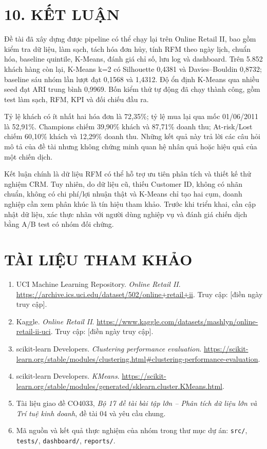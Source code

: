 \documentclass[a4paper]{article}
\begin{document}
\section*{10. KẾT LUẬN}

Đề tài đã xây dựng được pipeline có thể chạy lại trên Online Retail II, bao gồm kiểm tra dữ liệu, làm sạch, tách hóa đơn hủy, tính RFM theo ngày lịch, chuẩn hóa, baseline quintile, K-Means, đánh giá chỉ số, lưu log và dashboard. Trên 5.852 khách hàng còn lại, K-Means k=2 có Silhouette 0,4381 và Davies--Bouldin 0,8732; baseline sáu nhóm lần lượt đạt 0,1568 và 1,4312. Độ ổn định K-Means qua nhiều seed đạt ARI trung bình 0,9969. Bốn kiểm thử tự động đã chạy thành công, gồm test làm sạch, RFM, KPI và đối chiếu đầu ra.

Tỷ lệ khách có ít nhất hai hóa đơn là 72,35\%; tỷ lệ mua lại qua mốc 01/06/2011 là 52,91\%. Champions chiếm 39,90\% khách và 87,71\% doanh thu; At-risk/Lost chiếm 60,10\% khách và 12,29\% doanh thu. Những kết quả này trả lời các câu hỏi mô tả của đề tài nhưng không chứng minh quan hệ nhân quả hoặc hiệu quả của một chiến dịch.

Kết luận chính là dữ liệu RFM có thể hỗ trợ ưu tiên phân tích và thiết kế thử nghiệm CRM. Tuy nhiên, do dữ liệu cũ, thiếu Customer ID, không có nhãn chuẩn, không có chi phí/lợi nhuận thật và K-Means chỉ tạo hai cụm, doanh nghiệp cần xem phân khúc là tín hiệu tham khảo. Trước khi triển khai, cần cập nhật dữ liệu, xác thực nhãn với người dùng nghiệp vụ và đánh giá chiến dịch bằng A/B test có nhóm đối chứng.


\section*{TÀI LIỆU THAM KHẢO}

\begin{enumerate}
\item UCI Machine Learning Repository. \textit{Online Retail II}. \url{https://archive.ics.uci.edu/dataset/502/online+retail+ii}. Truy cập: [điền ngày truy cập].
\item Kaggle. \textit{Online Retail II}. \url{https://www.kaggle.com/datasets/mashlyn/online-retail-ii-uci}. Truy cập: [điền ngày truy cập].
\item scikit-learn Developers. \textit{Clustering performance evaluation}. \url{https://scikit-learn.org/stable/modules/clustering.html#clustering-performance-evaluation}.
\item scikit-learn Developers. \textit{KMeans}. \url{https://scikit-learn.org/stable/modules/generated/sklearn.cluster.KMeans.html}.
\item Tài liệu giao đề CO4033, \textit{Bộ 17 đề tài bài tập lớn -- Phân tích dữ liệu lớn và Trí tuệ kinh doanh}, đề tài 04 và yêu cầu chung.
\item Mã nguồn và kết quả thực nghiệm của nhóm trong thư mục dự án: \texttt{src/}, \texttt{tests/}, \texttt{dashboard/}, \texttt{reports/}.
\end{enumerate}
\end{document}
